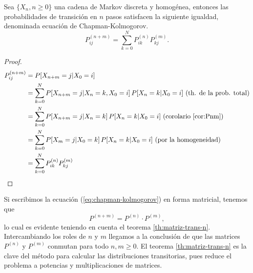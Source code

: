 \begin{teorema}
    Sea $\{X_n,n\geq 0\}$ una cadena de Markov discreta y homogénea, entonces las probabilidades de transición en $n$ pasos satisfacen la siguiente igualdad, denominada ecuación de Chapman-Kolmogorov.
    \begin{equation}
        \label{eq:chapman-kolmogorov}
        P_{ij}^{(n+m)}=\sum_{k=0}^N P_{ik}^{(n)}P_{kj}^{(m)}.
    \end{equation} 
\end{teorema}
\begin{proof}
    \begin{equation*}
        \begin{split}
            P_{ij}^{(n+m)} &= P[X_{n+m}=j|X_0=i] \\
            &= \sum_{k=0}^N P[X_{n+m}=j|X_n=k,X_0=i]\,P[X_n=k|X_0=i]\text{ (th. de la prob. total)}\\
            &= \sum_{k=0}^N P[X_{n+m}=j|X_n=k]\,P[X_n=k|X_0=i]\text{ (corolario \ref{cor:Pnm})}\\
            &= \sum_{k=0}^N P[X_{m}=j|X_0=k]\,P[X_n=k|X_0=i]\text{ (por la homogeneidad)}\\
            &= \sum_{k=0}^N P_{ik}^{(n)} P_{kj}^{(m)}
        \end{split}
    \end{equation*}
\end{proof}

Si escribimos la ecuación (\ref{eq:chapman-kolmogorov}) en forma matricial, tenemos que
$$
P^{(n+m)}=P^{(n)}\cdot P^{(m)},
$$
lo cual es evidente teniendo en cuenta el teorema \ref{th:matriz-trans-n}. Intercambiando los roles de $n$ y $m$ llegamos a la conclusión de que las matrices $P^{(n)}$ y $P^{(m)}$ conmutan para todo $n,m\geq 0$. El teorema \ref{th:matriz-trans-n} es la clave del método para calcular las distribuciones transitorias, pues reduce el problema a potencias y multiplicaciones de matrices.

